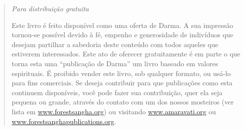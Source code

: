 
\cleartoverso
\thispagestyle{empty}

\mbox{}

\vfill

\begin{quote}

{\centering\large\itshape
Para distribuição gratuita
\par}

\bigskip

Este livro é feito disponível como uma oferta de Darma. A sua impressão
tornou-se possível devido à fé, empenho e generosidade de indivíduos que
desejam partilhar a sabedoria deste conteúdo com todos aqueles que estiverem
interessados. Este ato de oferecer gratuitamente é em parte o que torna esta
uma “publicação de Darma” um livro baseado em valores espirituais. É proibido
vender este livro, sob qualquer formato, ou usá-lo para fins comerciais.  Se
deseja contribuir para que publicações como esta continuem disponíveis, você
pode fazer sua contribuição, quer ela seja pequena ou grande, através do
contato com um dos nossos mosteiros (ver lista em \href{http://forestsangha.org}{www.forestsangha.org}) ou
visitando \href{http://amaravati.org}{www.amaravati.org} ou \href{http://forestsanghapublications.org}{www.forestsanghapublications.org}.
\end{quote}

\vfill

\mbox{}

